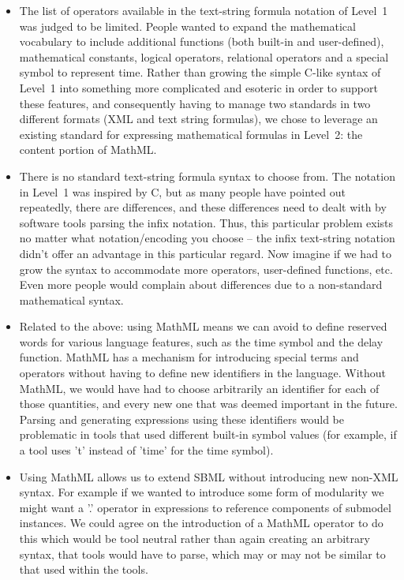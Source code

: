 \documentclass{sbmlfaq}
\begin{document}
\begin{itemize}

\item The list of operators available in the text-string formula
  notation of Level~1 was judged to be limited.  People
  wanted to expand the mathematical vocabulary to include
  additional functions (both built-in and user-defined),
  mathematical constants, logical operators, relational
  operators and a special symbol to represent time.  Rather
  than growing the simple C-like syntax of Level~1 into
  something more complicated and esoteric in order to
  support these features, and consequently having to manage
  two standards in two different formats (XML and text
  string formulas), we chose to leverage an existing
  standard for expressing mathematical formulas in Level~2:
  the content portion of MathML.

\item There is no standard text-string formula syntax to choose
  from.  The notation in Level~1 was inspired by C, but as
  many people have pointed out repeatedly, there are
  differences, and these differences need to dealt with by
  software tools parsing the infix notation.  Thus, this
  particular problem exists no matter what notation/encoding
  you choose -- the infix text-string notation didn't offer
  an advantage in this particular regard.  Now imagine if we
  had to grow the syntax to accommodate more operators,
  user-defined functions, etc.  Even more people would
  complain about differences due to a non-standard
  mathematical syntax.
  
\item Related to the above: using MathML means we can avoid to define
  reserved words for various language features, such as the time symbol and
  the delay function.  MathML has a mechanism for introducing special terms
  and operators without having to define new identifiers in the language.
  Without MathML, we would have had to choose arbitrarily an identifier for
  each of those quantities, and every new one that was deemed important in
  the future.  Parsing and generating expressions using these identifiers
  would be problematic in tools that used different built-in symbol values
  (for example, if a tool uses 't' instead of 'time' for the time symbol).

\item Using MathML allows us to extend SBML without introducing new non-XML
  syntax.  For example if we wanted to introduce some form of modularity we
  might want a '.' operator in expressions to reference components of
  submodel instances.  We could agree on the introduction of a MathML
  operator to do this which would be tool neutral rather than again
  creating an arbitrary syntax, that tools would have to parse, which may
  or may not be similar to that used within the tools.


\end{itemize}
\end{document}
